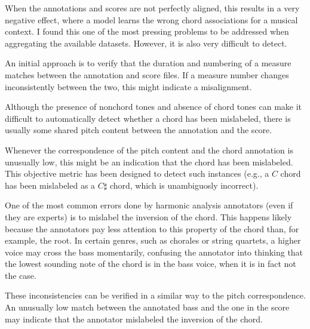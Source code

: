 





When the annotations and scores are not perfectly aligned,
this results in a very negative effect, where a model learns
the wrong chord associations for a musical context. I found
this one of the most pressing problems to be addressed when
aggregating the available datasets. However, it is also very
difficult to detect.

An initial approach is to verify that the duration and
numbering of a measure matches between the annotation and
score files. If a measure number changes inconsistently
between the two, this might indicate a misalignment.


Although the presence of nonchord tones and absence of chord
tones can make it difficult to automatically detect whether
a chord has been mislabeled, there is usually some shared
pitch content between the annotation and the score.

Whenever the correspondence of the pitch content and the
chord annotation is unusually low, this might be an
indication that the chord has been mislabeled. This
objective metric has been designed to detect such instances
(e.g., a $C$ chord has been mislabeled as a $C\sharp$ chord,
which is unambiguosly incorrect).



One of the most common errors done by harmonic analysis
annotators (even if they are experts) is to mislabel the
inversion of the chord. This happens likely because the
annotators pay less attention to this property of the chord
than, for example, the root. In certain genres, such as
chorales or string quartets, a higher voice may cross the
bass momentarily, confusing the annotator into thinking that
the lowest sounding note of the chord is in the bass voice,
when it is in fact not the case.

These inconsistencies can be verified in a similar way to
the pitch correspondence. An unusually low match between the
annotated bass and the one in the score may indicate that
the annotator mislabeled the inversion of the chord.

